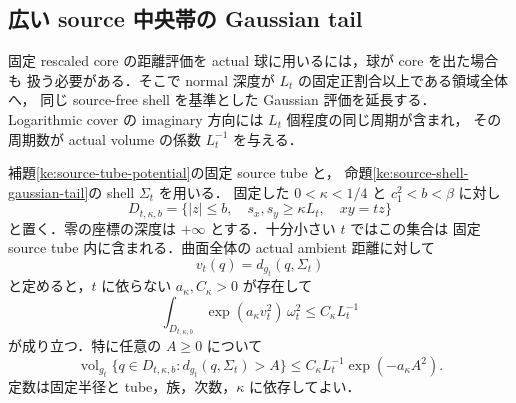 \subsection{広い source 中央帯の Gaussian tail}
\label{ke:source-wide-gaussian-section}

固定 rescaled core の距離評価を actual 球に用いるには，球が core を出た場合も
扱う必要がある．そこで normal 深度が $L_t$ の固定正割合以上である領域全体へ，
同じ source-free shell を基準とした Gaussian 評価を延長する．
Logarithmic cover の imaginary 方向には $L_t$ 個程度の同じ周期が含まれ，
その周期数が actual volume の係数 $L_t^{-1}$ を与える．

\begin{proposition}
\label{ke:source-wide-gaussian-tail}
補題\ref{ke:source-tube-potential}の固定 source tube と，
命題\ref{ke:source-shell-gaussian-tail}の shell $\Sigma_t$ を用いる．
固定した $0<\kappa<1/4$ と $c_1^2<b<\beta$ に対し
\[
 D_{t,\kappa,b}
 =\{|z|\le b,\quad s_x,s_y\ge\kappa L_t,\quad xy=tz\}
\]
と置く．零の座標の深度は $+\infty$ とする．十分小さい $t$ ではこの集合は
固定 source tube 内に含まれる．曲面全体の actual ambient 距離に対して
\[
 v_t(q)=d_{g_t}(q,\Sigma_t)
\]
と定めると，$t$ に依らない $a_\kappa,C_\kappa>0$ が存在して
\begin{equation}\label{ke:eq:source-wide-gaussian-tail}
 \int_{D_{t,\kappa,b}}\exp(a_\kappa v_t^2)\,\omega_t^2
 \le C_\kappa L_t^{-1}
\end{equation}
が成り立つ．特に任意の $A\ge0$ について
\[
 \operatorname{vol}_{g_t}
 \{q\in D_{t,\kappa,b}:d_{g_t}(q,\Sigma_t)>A\}
 \le C_\kappa L_t^{-1}\exp(-a_\kappa A^2).
\]
定数は固定半径と tube，族，次数，$\kappa$ に依存してよい．
\end{proposition}

